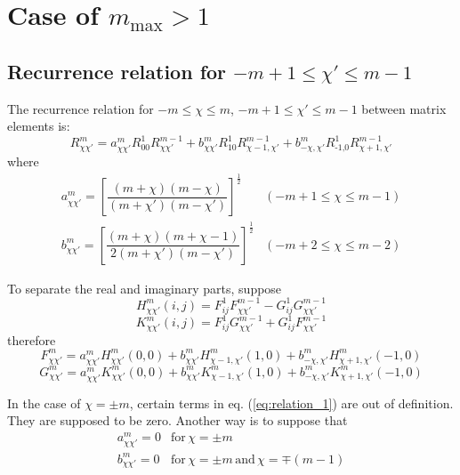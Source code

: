 \section{Case of $m_{\mathrm{max}}>1$}


\subsection{Recurrence relation for $-m+1\leq\chi'\leq m-1$}

The recurrence relation for $-m\leq\chi\leq m$, $-m+1\leq\chi'\leq m-1$
between matrix elements is:
\begin{equation}
R_{\chi\chi'}^{m}=a_{\chi\chi'}^{m}R_{00}^{1}R_{\chi\chi'}^{m-1}+b_{\chi\chi'}^{m}R_{10}^{1}R_{\chi-1,\chi'}^{m-1}+b_{-\chi,\chi'}^{m}R_{\text{-1,}0}^{1}R_{\chi+1,\chi'}^{m-1}\label{eq:relation_1}
\end{equation}
where
\begin{equation}
\begin{array}{ll}
a_{\chi\chi'}^{m}=\left[\dfrac{\left(m+\chi\right)\left(m-\chi\right)}{\left(m+\chi'\right)\left(m-\chi'\right)}\right]^{\frac{1}{2}} & (-m+1\leq\chi\leq m-1)\\
b_{\chi\chi'}^{m}=\left[\dfrac{\left(m+\chi\right)\left(m+\chi-1\right)}{2\left(m+\chi'\right)\left(m-\chi'\right)}\right]^{\frac{1}{2}} & (-m+2\leq\chi\leq m-2)
\end{array}
\end{equation}


To separate the real and imaginary parts, suppose
\begin{equation}
H_{\chi\chi'}^{m}(i,j)=F_{ij}^{1}F_{\chi\chi'}^{m-1}-G_{ij}^{1}G_{\chi\chi'}^{m-1}
\end{equation}
\begin{equation}
K_{\chi\chi'}^{m}(i,j)=F_{ij}^{1}G_{\chi\chi'}^{m-1}+G_{ij}^{1}F_{\chi\chi'}^{m-1}
\end{equation}
therefore
\begin{equation}
F_{\chi\chi'}^{m}=a_{\chi\chi'}^{m}H_{\chi\chi'}^{m}(0,0)+b_{\chi\chi'}^{m}H_{\chi-1,\chi'}^{m}(1,0)+b_{-\chi,\chi'}^{m}H_{\chi+1,\chi'}^{m}(-1,0)
\end{equation}
\begin{equation}
G_{\chi\chi'}^{m}=a_{\chi\chi'}^{m}K_{\chi\chi'}^{m}(0,0)+b_{\chi\chi'}^{m}K_{\chi-1,\chi'}^{m}(1,0)+b_{-\chi,\chi'}^{m}K_{\chi+1,\chi'}^{m}(-1,0)
\end{equation}


In the case of $\chi=\pm m$, certain terms in eq. (\ref{eq:relation_1})
are out of definition. They are supposed to be zero. Another way is
to suppose that
\begin{equation}
\begin{array}{ll}
a_{\chi\chi'}^{m}=0 & \mathrm{for}\,\chi=\pm m\\
b_{\chi\chi'}^{m}=0 & \mathrm{for}\,\chi=\pm m\,\mathrm{and}\,\chi=\mp(m-1)
\end{array}
\end{equation}



